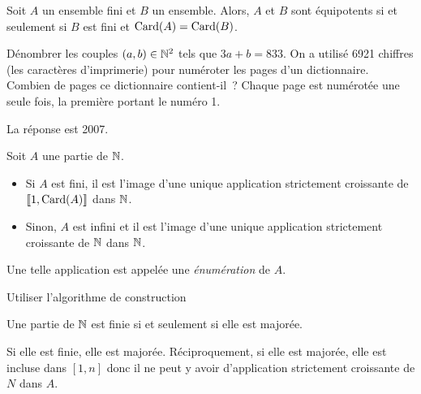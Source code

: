 \documentclass{magnolia}
\begin{document}
\begin{proposition}
Soit $A$ un ensemble fini et $B$ un ensemble. Alors, $A$ et $B$ sont équipotents si et
seulement si $B$ est fini et $\operatorname{Card}(A)=\operatorname{Card}(B)$.  
\end{proposition}


\begin{exos}
\exo Dénombrer les couples $(a,b) \in \mathbb{N}^2$ tels que $3a + b = 833$.
\exo On a utilisé 6921 chiffres (les caractères d'imprimerie) pour numéroter les
  pages d'un dictionnaire. Combien de pages ce dictionnaire contient-il~?
  Chaque page est numérotée une seule fois, la première portant le numéro 1.
  \begin{sol}
  La réponse est 2007.
  \end{sol}
\end{exos}

\begin{definition}
Soit $A$ une partie de $\mathbb{N}$.
\begin{itemize}
\item Si $A$ est fini, il est l'image d'une unique application
  strictement croissante de $\left\llbracket 1,\operatorname{Card}(A)\right\rrbracket$ dans $\mathbb{N}$.
\item Sinon, $A$ est infini et il est l'image d'une unique application strictement
  croissante de $\mathbb{N}$ dans $\mathbb{N}$.
\end{itemize}
Une telle application est appelée une \emph{énumération} de $A$.
\end{definition}

\begin{preuve}
Utiliser l'algorithme de construction
\end{preuve}


\begin{proposition}
Une partie de $\mathbb{N}$ est finie si et seulement si elle est majorée.
\end{proposition}

\begin{preuve}
Si elle est finie, elle est majorée.
Réciproquement, si elle est majorée, elle est incluse dans $[1,n]$ donc il ne
peut y avoir d'application strictement croissante de $N$ dans $A$.  
\end{preuve}
\end{document}
